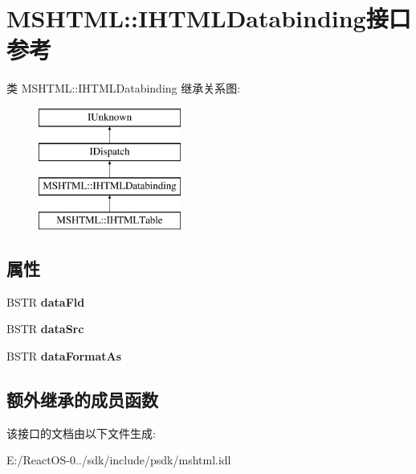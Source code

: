 \hypertarget{interface_m_s_h_t_m_l_1_1_i_h_t_m_l_databinding}{}\section{M\+S\+H\+T\+ML\+:\+:I\+H\+T\+M\+L\+Databinding接口 参考}
\label{interface_m_s_h_t_m_l_1_1_i_h_t_m_l_databinding}
类 M\+S\+H\+T\+ML\+:\+:I\+H\+T\+M\+L\+Databinding 继承关系图\+:\begin{figure}[H]
\begin{center}
\leavevmode
\includegraphics[height=4.000000cm]{interface_m_s_h_t_m_l_1_1_i_h_t_m_l_databinding}
\end{center}
\end{figure}
\subsection*{属性}
\begin{DoxyCompactItemize}
\item 
\mbox{\label{interface_m_s_h_t_m_l_1_1_i_h_t_m_l_databinding_a64257b72918b7c7951ab36f2b6c9f4d9}} 
B\+S\+TR {\bfseries data\+Fld}
\item 
\mbox{\label{interface_m_s_h_t_m_l_1_1_i_h_t_m_l_databinding_a2f4ab0dc78e3c4d2c3b7326839a0527d}} 
B\+S\+TR {\bfseries data\+Src}
\item 
\mbox{\label{interface_m_s_h_t_m_l_1_1_i_h_t_m_l_databinding_ac2d8a17110a6860f61703ef15093c2a7}} 
B\+S\+TR {\bfseries data\+Format\+As}
\end{DoxyCompactItemize}
\subsection*{额外继承的成员函数}


该接口的文档由以下文件生成\+:\begin{DoxyCompactItemize}
\item 
E\+:/\+React\+O\+S-\/0../sdk/include/psdk/mshtml.\+idl\end{DoxyCompactItemize}
